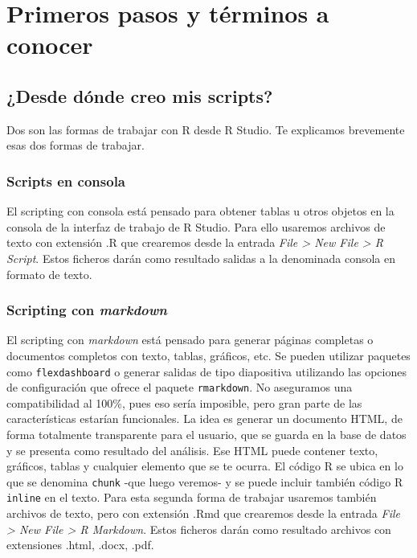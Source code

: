 \documentclass[
]{book}
\begin{document}
\hypertarget{tse02}{%
\chapter{Primeros pasos y términos a conocer}\label{tse02}}

\hypertarget{desde-duxf3nde-creo-mis-scripts}{%
\section{¿Desde dónde creo mis scripts?}\label{desde-duxf3nde-creo-mis-scripts}}

Dos son las formas de trabajar con R desde R Studio. Te explicamos brevemente esas dos formas de trabajar.

\hypertarget{scripts-en-consola}{%
\subsection{Scripts en consola}\label{scripts-en-consola}}

El scripting con consola está pensado para obtener tablas u otros objetos en la consola de la interfaz de trabajo de R Studio. Para ello usaremos archivos de texto con extensión .R que crearemos desde la entrada \emph{File \textgreater{} New File \textgreater{} R Script}. Estos ficheros darán como resultado salidas a la denominada consola en formato de texto.

\hypertarget{scripting-con-markdown}{%
\subsection{\texorpdfstring{Scripting con \emph{markdown}}{Scripting con markdown}}\label{scripting-con-markdown}}

El scripting con \emph{markdown} está pensado para generar páginas completas o documentos completos con texto, tablas, gráficos, etc. Se pueden utilizar paquetes como \texttt{flexdashboard} o generar salidas de tipo diapositiva utilizando las opciones de configuración que ofrece el paquete \texttt{rmarkdown}. No aseguramos una compatibilidad al 100\%, pues eso sería imposible, pero gran parte de las características estarían funcionales. La idea es generar un documento HTML, de forma totalmente transparente para el usuario, que se guarda en la base de datos y se presenta como resultado del análisis. Ese HTML puede contener texto, gráficos, tablas y cualquier elemento que se te ocurra. El código R se ubica en lo que se denomina \texttt{chunk} -que luego veremos- y se puede incluir también código R \texttt{inline} en el texto. Para esta segunda forma de trabajar usaremos también archivos de texto, pero con extensión .Rmd que crearemos desde la entrada \emph{File \textgreater{} New File \textgreater{} R Markdown}. Estos ficheros darán como resultado archivos con extensiones .html, .docx, .pdf.
\end{document}
